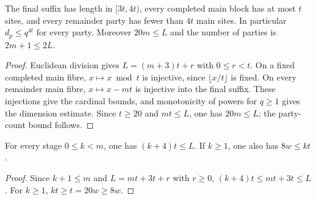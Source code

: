 \begin{lemma}
    \label{thm:chain_terminal_block_sizes}
    \leanok
    The final suffix has length in $[3t,4t)$, every completed main
    block has at most $t$ sites, and every remainder party has fewer
    than $4t$ main sites. In particular $d_p\le q^{4t}$ for every party.
    Moreover $20m\le L$ and the number of parties is $2m+1\le2L$.
\end{lemma}
\begin{proof}\leanok
    Euclidean division gives $L=(m+3)t+r$ with $0\le r<t$.
    On a fixed completed main fibre, $x\mapsto x\bmod t$ is injective,
    since $\lfloor x/t\rfloor$ is fixed. On every remainder main fibre,
    $x\mapsto x-mt$ is injective into the final suffix. These injections
    give the cardinal bounds, and monotonicity of powers for $q\ge1$
    gives the dimension estimate. Since $t\ge20$ and $mt\le L$, one
    has $20m\le L$; the party-count bound follows.
\end{proof}

\begin{lemma}
    \label{thm:chain_stage_margins}
    \leanok
    For every stage $0\le k<m$, one has $(k+4)t\le L$.
    If $k\ge1$, one also has $8w\le kt$.
\end{lemma}
\begin{proof}
    \leanok
    Since $k+1\le m$ and $L=mt+3t+r$ with $r\ge0$,
    $(k+4)t\le mt+3t\le L$. For $k\ge1$,
    $kt\ge t=20w\ge8w$.
\end{proof}

